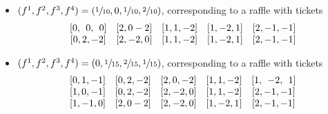 \begin{itemize}
    \item $(f^1,f^2,f^3,f^4)=(\sfrac{1}{10},0,\sfrac{1}{10},\sfrac{2}{10})$, corresponding to a raffle with tickets
    \begin{equation*}
    \begin{array}{*{5}c}
        {[0,\;\, 0,\;\, 0]}  & {[2,0-2]} & {[1,1,-2]} & {[1,-2,1]} & {[2,-1,-1]} \\
        {[0,2,-2]} & {[2,-2,0]} & {[1,1,-2]} & {[1,-2,1]} & {[2,-1,-1]}
    \end{array}
    \end{equation*}
    \item $(f^1,f^2,f^3,f^4)=(0,\sfrac{1}{15},\sfrac{2}{15},\sfrac{1}{15})$, corresponding to a raffle with tickets
    \begin{equation*}
    \begin{array}{*{5}c}
        {[0,1,-1]} & {[0,2,-2]} & {[2,0,-2]} & {[1,1,-2]} & {[1,\;\, -2,\;\, 1]}  \\
        {[1,0,-1]} & {[0,2,-2]} & {[2,-2,0]} & {[1,1,-2]} & {[2,-1,-1]} \\ 
        {[1,-1,0]} & {[2,0-2]} & {[2,-2,0]} & {[1,-2,1]} & {[2,-1,-1]}
    \end{array}
    \end{equation*}
\end{itemize}



